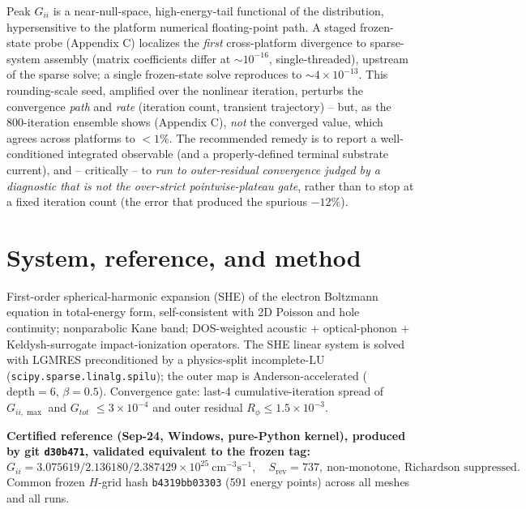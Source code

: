 \documentclass[11pt]{article}
\newcommand{\ten}[1]{\times 10^{#1}}
\begin{document}
Peak $G_{ii}$ is a near-null-space, high-energy-tail functional of the distribution, hypersensitive to the platform numerical floating-point path. A staged frozen-state probe (Appendix C) localizes the \emph{first} cross-platform divergence to sparse-system assembly (matrix coefficients differ at $\sim10^{-16}$, single-threaded), upstream of the sparse solve; a single frozen-state solve reproduces to $\sim4\ten{-13}$. This rounding-scale seed, amplified over the nonlinear iteration, perturbs the convergence \emph{path} and \emph{rate} (iteration count, transient trajectory) -- but, as the 800-iteration ensemble shows (Appendix C), \emph{not} the converged value, which agrees across platforms to $<1\%$. The recommended remedy is to report a well-conditioned integrated observable (and a properly-defined terminal substrate current), and -- critically -- to \emph{run to outer-residual convergence judged by a diagnostic that is not the over-strict pointwise-plateau gate}, rather than to stop at a fixed iteration count (the error that produced the spurious $-12\%$).

\section{System, reference, and method}
First-order spherical-harmonic expansion (SHE) of the electron Boltzmann equation in total-energy form, self-consistent with 2D Poisson and hole continuity; nonparabolic Kane band; DOS-weighted acoustic + optical-phonon + Keldysh-surrogate impact-ionization operators. The SHE linear system is solved with LGMRES preconditioned by a physics-split incomplete-LU (\texttt{scipy.sparse.linalg.spilu}); the outer map is Anderson-accelerated ($\text{depth}=6$, $\beta=0.5$). Convergence gate: last-4 cumulative-iteration spread of $G_{ii,\max}$ and $G_{tot}$ $\le 3\ten{-4}$ and outer residual $R_\phi\le 1.5\ten{-3}$.

\textbf{Certified reference (Sep-24, Windows, pure-Python kernel), produced by git \texttt{d30b471}, validated equivalent to the frozen tag:}
\[
G_{ii}=3.075619/2.136180/2.387429\ten{25}\ \mathrm{cm^{-3}s^{-1}},\quad S_{\mathrm{rev}}=737,\ \text{non-monotone, Richardson suppressed.}
\]
Common frozen $H$-grid hash \texttt{b4319bb03303} (591 energy points) across all meshes and all runs.
\end{document}
